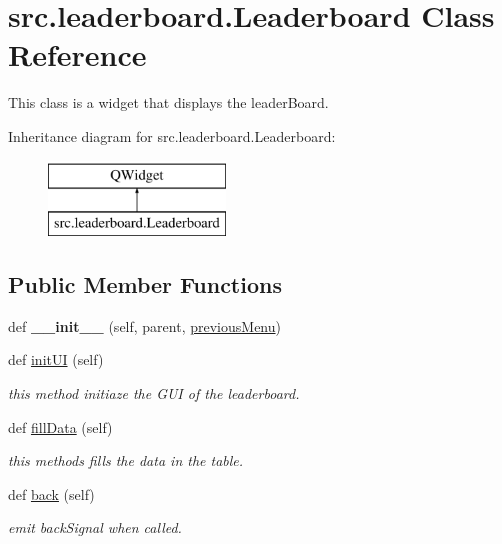 \hypertarget{classsrc_1_1leaderboard_1_1_leaderboard}{}\section{src.\+leaderboard.\+Leaderboard Class Reference}
\label{classsrc_1_1leaderboard_1_1_leaderboard}


This class is a widget that displays the leader\+Board.  


Inheritance diagram for src.\+leaderboard.\+Leaderboard\+:\begin{figure}[H]
\begin{center}
\leavevmode
\includegraphics[height=2.000000cm]{classsrc_1_1leaderboard_1_1_leaderboard}
\end{center}
\end{figure}
\subsection*{Public Member Functions}
\begin{DoxyCompactItemize}
\item 
\hypertarget{classsrc_1_1leaderboard_1_1_leaderboard_a7455e00826b66e77d6d56d0970af18b5}{}def {\bfseries \+\_\+\+\_\+init\+\_\+\+\_\+} (self, parent, \hyperlink{classsrc_1_1leaderboard_1_1_leaderboard_abca7271f8092bb5672bf66c04971e04e}{previous\+Menu})\label{classsrc_1_1leaderboard_1_1_leaderboard_a7455e00826b66e77d6d56d0970af18b5}

\item 
def \hyperlink{classsrc_1_1leaderboard_1_1_leaderboard_ad5925cc40678e00c529938ee5105d833}{init\+U\+I} (self)
\begin{DoxyCompactList}\small\item\em this method initiaze the G\+U\+I of the leaderboard. \end{DoxyCompactList}\item 
def \hyperlink{classsrc_1_1leaderboard_1_1_leaderboard_a0cf6394bf691c593a05dadf3969536ba}{fill\+Data} (self)
\begin{DoxyCompactList}\small\item\em this methods fills the data in the table. \end{DoxyCompactList}\item 
def \hyperlink{classsrc_1_1leaderboard_1_1_leaderboard_ade0e52e1b6809df57ea4b1a167c0257b}{back} (self)
\begin{DoxyCompactList}\small\item\em emit back\+Signal when called. \end{DoxyCompactList}\end{DoxyCompactItemize}
